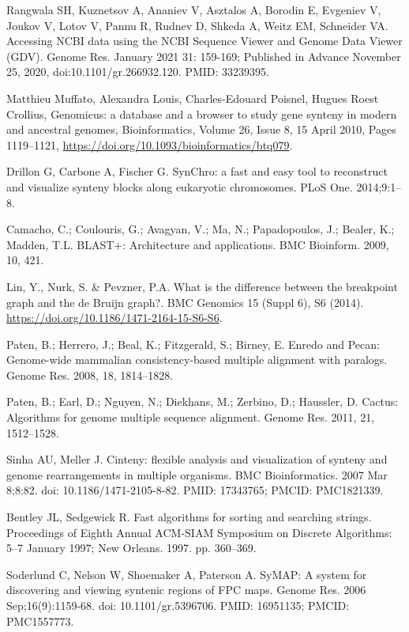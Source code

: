 \documentclass[12pt]{article}
\begin{document}
\begin{thebibliography}{99}
 Rangwala SH, Kuznetsov A, Ananiev V, Asztalos A, Borodin E,
Evgeniev V, Joukov V, Lotov V, Pannu R, Rudnev D, Shkeda A, Weitz EM, Schneider
VA. Accessing NCBI data using the NCBI Sequence Viewer and Genome Data Viewer
(GDV). Genome Res. January 2021 31: 159-169; Published in Advance November 25,
2020, doi:10.1101/gr.266932.120. PMID: 33239395.

 Matthieu Muffato, Alexandra Louis, Charles-Edouard Poisnel,
Hugues Roest Crollius, Genomicus: a database and a browser to study gene
synteny in modern and ancestral genomes, Bioinformatics, Volume 26, Issue 8,
15 April 2010, Pages 1119–1121,
\url{https://doi.org/10.1093/bioinformatics/btq079}.

 Drillon G, Carbone A, Fischer G. SynChro: a fast and easy
tool to reconstruct and visualize synteny blocks along eukaryotic chromosomes.
PLoS One. 2014;9:1–8.

 Camacho, C.; Coulouris, G.; Avagyan, V.; Ma, N.;
Papadopoulos, J.; Bealer, K.; Madden, T.L. BLAST+: Architecture and
applications. BMC Bioinform. 2009, 10, 421.

 Lin, Y., Nurk, S. \& Pevzner, P.A. What is the difference
between the breakpoint graph and the de Bruijn graph?. BMC Genomics 15
(Suppl 6), S6 (2014). \url{https://doi.org/10.1186/1471-2164-15-S6-S6}.

 Paten, B.; Herrero, J.; Beal, K.; Fitzgerald, S.; Birney,
E. Enredo and Pecan: Genome-wide mammalian consistency-based multiple alignment
with paralogs. Genome Res. 2008, 18, 1814–1828.

 Paten, B.; Earl, D.; Nguyen, N.; Diekhans, M.; Zerbino, D.;
Haussler, D. Cactus: Algorithms for genome multiple sequence alignment.
Genome Res. 2011, 21, 1512–1528.

 Sinha AU, Meller J. Cinteny: flexible analysis and
visualization of synteny and genome rearrangements in multiple organisms.
BMC Bioinformatics. 2007 Mar 8;8:82. doi: 10.1186/1471-2105-8-82.
PMID: 17343765; PMCID: PMC1821339.

 Bentley JL, Sedgewick R. Fast algorithms for sorting and searching
strings. Proceedings of Eighth Annual ACM-SIAM Symposium on Discrete
Algorithms: 5–7 January 1997; New Orleans. 1997. pp. 360–369.

 Soderlund C, Nelson W, Shoemaker A, Paterson A. SyMAP: A system
for discovering and viewing syntenic regions of FPC maps. Genome Res. 2006
Sep;16(9):1159-68. doi: 10.1101/gr.5396706. PMID: 16951135; PMCID: PMC1557773.


\end{thebibliography}
\end{document}
